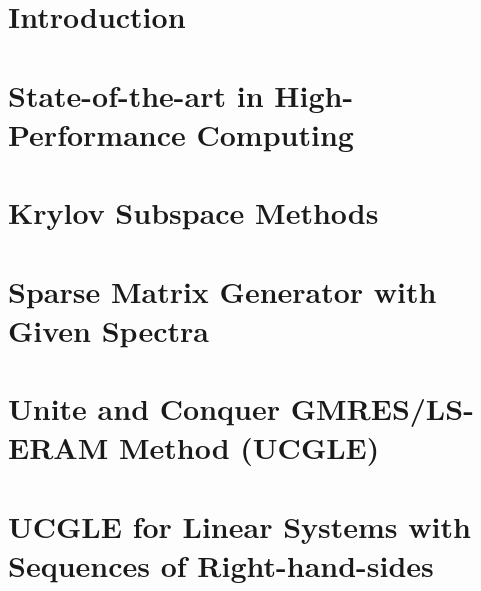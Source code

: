 \documentclass{xinzhewu}
\begin{document}
\clearemptydoublepage


\clearemptydoublepage

\frontmatter

{\tableofcontents}

{
\listoffigures
{}
}

{
\listoftables
{}
}

{
\listofalgorithms
{}
}



\mainmatter %

\chapter{Introduction}



\chapter{State-of-the-art in High-Performance Computing} \label{State-of-the-art in High-Performance Computing}



\chapter{Krylov Subspace Methods}\label{Krylov Subspace Methods}



\chapter{Sparse Matrix Generator with Given Spectra}\label{Sparse Matrix Generator with Given Spectra}



\chapter[Unite and Conquer GMRES/LS-ERAM Method (UCGLE)]{Unite and Conquer GMRES/LS-ERAM Method (UCGLE)}\label{Unite and Conquer GMRES/LS-ERAM Method}



\chapter{UCGLE for Linear Systems with Sequences of Right-hand-sides}\label{UCGLE for Linear Systems with Sequences of Right-hand-sides}
\end{document}
